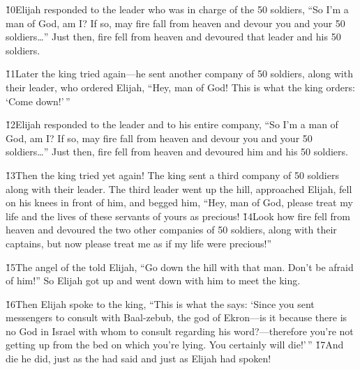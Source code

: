 \v{10}Elijah responded to the leader who was in charge of the 50 soldiers, ``So I'm a man of God, am I? If so, may fire fall from heaven and devour you and your 50 soldiers{\ldots}'' Just then, fire fell from heaven and devoured that leader and his 50 soldiers.

\v{11}Later the king tried again---he sent another company of 50 soldiers, along with their leader, who ordered Elijah, ``Hey, man of God! This is what the king orders: `Come down!'\,''

\v{12}Elijah responded to the leader and to his entire company, ``So I'm a man of God, am I? If so, may fire fall from heaven and devour you and your 50 soldiers{\ldots}'' Just then, fire fell from heaven and devoured him and his 50 soldiers.

\v{13}Then the king tried yet again! The king sent a third company of 50 soldiers along with their leader. The third leader went up the hill, approached Elijah, fell on his knees in front of him, and begged him, ``Hey, man of God, please treat my life and the lives of these servants of yours as precious! \v{14}Look how fire fell from heaven and devoured the two other companies of 50 soldiers, along with their captains, but now please treat me as if my life were precious!''

\v{15}The angel of the  told Elijah, ``Go down the hill with that man. Don't be afraid of him!'' So Elijah got up and went down with him to meet the king.

\v{16}Then Elijah spoke to the king, ``This is what the  says: `Since you sent messengers to consult with Baal-zebub, the god of Ekron---is it because there is no God in Israel with whom to consult regarding his word?---therefore you're not getting up from the bed on which you're lying. You certainly will die!'\,'' \v{17}And die he did, just as the  had said and just as Elijah had spoken!

